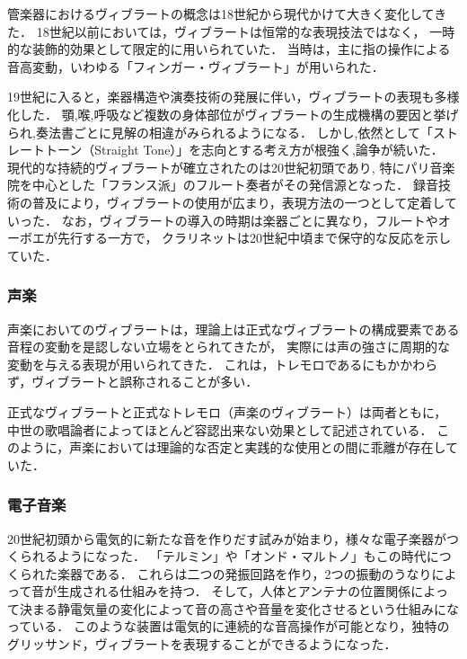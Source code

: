 管楽器におけるヴィブラートの概念は18世紀から現代かけて大きく変化してきた．
18世紀以前においては，ヴィブラートは恒常的な表現技法ではなく，
一時的な装飾的効果として限定的に用いられていた．
当時は，主に指の操作による音高変動，いわゆる「フィンガー・ヴィブラート」が用いられた．

19世紀に入ると，楽器構造や演奏技術の発展に伴い，ヴィブラートの表現も多様化した．
顎,喉,呼吸など複数の身体部位がヴィブラートの生成機構の要因と挙げられ,奏法書ごとに見解の相違がみられるようになる．
しかし,依然として「ストレートトーン（Straight Tone）」を志向とする考え方が根強く,論争が続いた．
現代的な持続的ヴィブラートが確立されたのは20世紀初頭であり,
特にパリ音楽院を中心とした「フランス派」のフルート奏者がその発信源となった．
録音技術の普及により，ヴィブラートの使用が広まり，表現方法の一つとして定着していった．
なお，ヴィブラートの導入の時期は楽器ごとに異なり，フルートやオーボエが先行する一方で，
クラリネットは20世紀中頃まで保守的な反応を示していた．



\subsubsection{声楽}

声楽においてのヴィブラートは，理論上は正式なヴィブラートの構成要素である音程の変動を是認しない立場をとられてきたが，
実際には声の強さに周期的な変動を与える表現が用いられてきた．
これは，トレモロであるにもかかわらず，ヴィブラートと誤称されることが多い．

正式なヴィブラートと正式なトレモロ（声楽のヴィブラート）は両者ともに，
中世の歌唱論者によってほとんど容認出来ない効果として記述されている．
このように，声楽においては理論的な否定と実践的な使用との間に乖離が存在していた．

\subsubsection{電子音楽}

20世紀初頭から電気的に新たな音を作りだす試みが始まり，様々な電子楽器がつくられるようになった．
「テルミン」や「オンド・マルトノ」もこの時代につくられた楽器である．
これらは二つの発振回路を作り，2つの振動のうなりによって音が生成される仕組みを持つ\cite{Kamogawa13}．
そして，人体とアンテナの位置関係によって決まる静電気量の変化によって音の高さや音量を変化させるという仕組みになっている．
このような装置は電気的に連続的な音高操作が可能となり，独特のグリッサンド，ヴィブラートを表現することができるようになった．


